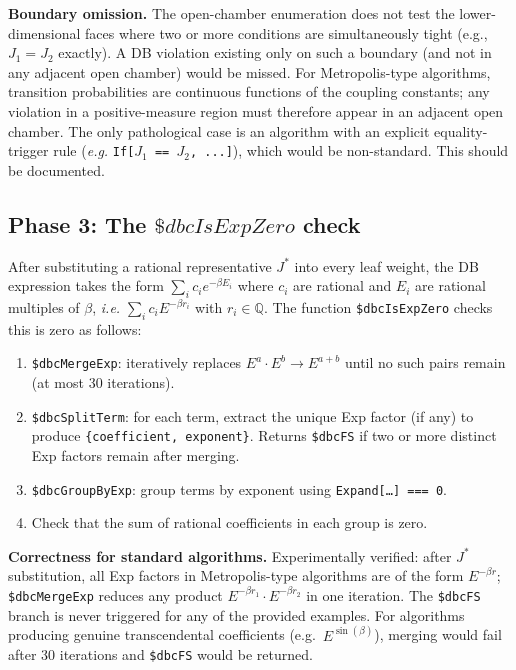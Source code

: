 \documentclass[12pt,a4paper]{article}
\theoremstyle{critical}
\theoremstyle{remark}
\theoremstyle{verified}
\begin{document}
\noindent\textbf{Boundary omission.}
The open-chamber enumeration does not test the lower-dimensional faces where two
or more conditions are simultaneously tight (e.g., $J_1 = J_2$ exactly).  A DB
violation existing only on such a boundary (and not in any adjacent open chamber)
would be missed.  For Metropolis-type algorithms, transition probabilities are
continuous functions of the coupling constants; any violation in a positive-measure
region must therefore appear in an adjacent open chamber.  The only pathological
case is an algorithm with an explicit equality-trigger rule (\emph{e.g.}
\texttt{If[$J_1$ == $J_2$, ...]}), which would be non-standard.  This should be
documented.

\subsection{Phase 3: The \texorpdfstring{$\$dbcIsExpZero$}{dbcIsExpZero} check}
\label{sec:expzero}

After substituting a rational representative $J^\ast$ into every leaf weight,
the DB expression takes the form $\sum_i c_i e^{-\beta E_i}$ where $c_i$ are
rational and $E_i$ are rational multiples of $\beta$, \emph{i.e.}
$\sum_i c_i E^{-\beta r_i}$ with $r_i \in \mathbb{Q}$.  The function
\texttt{\$dbcIsExpZero} checks this is zero as follows:

\begin{enumerate}
\item \texttt{\$dbcMergeExp}: iteratively replaces
  $E^a \cdot E^b \to E^{a+b}$ until no such pairs remain
  (at most 30 iterations).
\item \texttt{\$dbcSplitTerm}: for each term, extract the unique Exp factor (if
  any) to produce \texttt{\{coefficient, exponent\}}.  Returns \texttt{\$dbcFS}
  if two or more distinct Exp factors remain after merging.
\item \texttt{\$dbcGroupByExp}: group terms by exponent using
  \texttt{Expand[\ldots] === 0}.
\item Check that the sum of rational coefficients in each group is zero.
\end{enumerate}

\noindent\textbf{Correctness for standard algorithms.}
Experimentally verified: after $J^\ast$ substitution, all Exp factors in
Metropolis-type algorithms are of the form $E^{-\beta r}$; \texttt{\$dbcMergeExp}
reduces any product $E^{-\beta r_1} \cdot E^{-\beta r_2}$ in one iteration.
The \texttt{\$dbcFS} branch is never triggered for any of the provided examples.
For algorithms producing genuine transcendental coefficients
(e.g.\ $E^{\sin(\beta)}$), merging would fail after 30 iterations and
\texttt{\$dbcFS} would be returned.
\end{document}

